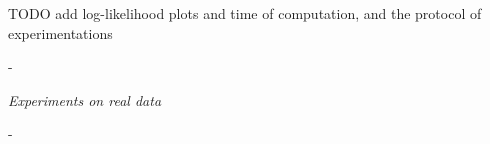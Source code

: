 \documentclass[10pt,a4paper]{report}
\begin{document}
TODO add log-likelihood plots and time of computation, and the protocol of experimentations

\newpage
-










\newpage
\begin{center}
\end{center}
\vspace{80pt}
\begin{center}
\Huge{\textit{Experiments on real data}}
\end{center}

\newpage
-

\end{document}
